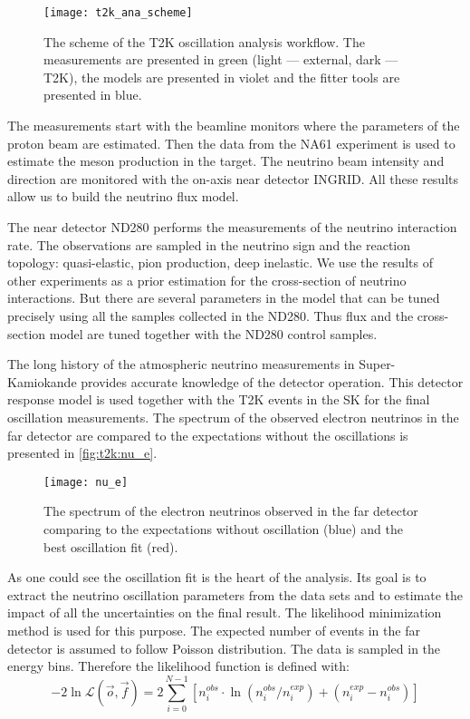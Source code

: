 \documentclass[../main.tex]{subfiles}
\begin{document}
\begin{figure}[!ht]
  \centering
  \texttt{[image: t2k\_ana\_scheme]}
  \caption{The scheme of the T2K oscillation analysis workflow. The measurements are presented in green (light --- external, dark --- T2K), the models are presented in violet and the fitter tools are presented in blue.}
  \label{fig:t2k:ana}
\end{figure}

The measurements start with the beamline monitors where the parameters of the proton beam are estimated. Then the data from the NA61 experiment is used to estimate the meson production in the target. The neutrino beam intensity and direction are monitored with the on-axis near detector INGRID. All these results allow us to build the neutrino flux model.

The near detector ND280 performs the measurements of the neutrino interaction rate. The observations are sampled in the neutrino sign and the reaction topology: quasi-elastic, pion production, deep inelastic. We use the results of other experiments as a prior estimation for the cross-section of neutrino interactions. But there are several parameters in the model that can be tuned precisely using all the samples collected in the ND280. Thus flux and the cross-section model are tuned together with the ND280 control samples.

The long history of the atmospheric neutrino measurements in Super-Kamiokande provides accurate knowledge of the detector operation. This detector response model is used together with the T2K events in the SK for the final oscillation measurements. The spectrum of the observed electron neutrinos in the far detector are compared to the expectations without the oscillations is presented in \autoref{fig:t2k:nu_e}.

\begin{figure}[!ht]
  \centering
  \texttt{[image: nu\_e]}
  \caption{The spectrum of the electron neutrinos observed in the far detector comparing to the expectations without oscillation (blue) and the best oscillation fit (red).}
  \label{fig:t2k:nu_e}
\end{figure}

As one could see the oscillation fit is the heart of the analysis. Its goal is to extract the neutrino oscillation parameters from the data sets and to estimate the impact of all the uncertainties on the final result. The likelihood minimization method is used for this purpose. The expected number of events in the far detector is assumed to follow Poisson distribution. The data is sampled in the energy bins. Therefore the likelihood function is defined with:
\begin{equation}
-2\ln\mathcal{L}\left(\overrightarrow{o}, \overrightarrow{f}\right)=2\sum^{N-1}_{i=0}\left[n_i^{obs}\cdot\ln\left(n_i^{obs}/n_i^{exp}\right)+\left(n_i^{exp}-n_i^{obs}\right)\right]
\end{equation}
\end{document}
